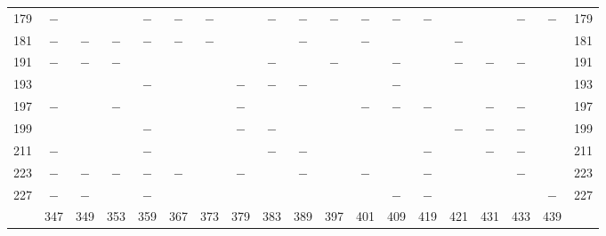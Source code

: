 \begin{center}
\begin{tabular}{r|c|c|c|c|c|c|c|c|c|c|c|c|c|c|c|c|c|r}
179 & $-$ &  &  & $-$ & $-$ & $-$ &  & $-$ & $-$ & $-$ & $-$ & $-$ & $-$ &  &  & $-$ & $-$ & 179\\
181 & $-$ & $-$ & $-$ & $-$ & $-$ & $-$ &  &  & $-$ &  & $-$ &  &  & $-$ &  &  &  & 181\\
191 & $-$ & $-$ & $-$ &  &  &  &  & $-$ &  & $-$ &  & $-$ &  & $-$ & $-$ & $-$ &  & 191\\
193 &  &  &  & $-$ &  &  & $-$ & $-$ & $-$ &  &  & $-$ &  &  &  &  &  & 193\\
197 & $-$ &  & $-$ &  &  &  & $-$ &  &  &  & $-$ & $-$ & $-$ &  & $-$ & $-$ &  & 197\\
199 &  &  &  & $-$ &  &  & $-$ & $-$ &  &  &  &  &  & $-$ & $-$ & $-$ &  & 199\\
211 & $-$ &  &  & $-$ &  &  &  & $-$ & $-$ &  &  &  & $-$ &  & $-$ & $-$ &  & 211\\
223 & $-$ & $-$ & $-$ & $-$ & $-$ &  & $-$ &  & $-$ &  & $-$ &  & $-$ &  &  & $-$ &  & 223\\
227 & $-$ & $-$ &  & $-$ &  &  &  &  &  &  &  & $-$ & $-$ &  &  &  & $-$ & 227\\
\hline
 & 347 & 349 & 353 & 359 & 367 & 373 & 379 & 383 & 389 & 397 & 401 & 409 & 419 & 421 & 431 & 433 & 439 & \\
\hline
\end{tabular}\endgroup\end{center}
\clearpage
